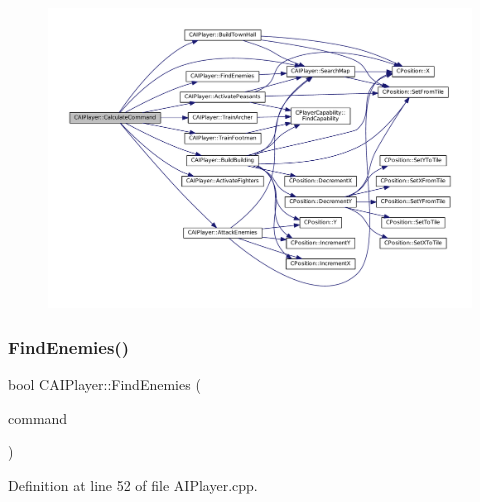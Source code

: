 \begin{figure}[H]
\begin{center}
\leavevmode
\includegraphics[width=350pt]{classCAIPlayer_ae2742efd250c7d6c00b659ccc29c4be3_cgraph}
\end{center}
\end{figure}
\hypertarget{classCAIPlayer_a33b1533570e7a00114d1b85b3551e395}{}\label{classCAIPlayer_a33b1533570e7a00114d1b85b3551e395} 
\subsubsection{\texorpdfstring{Find\+Enemies()}{FindEnemies()}}
{\footnotesize\ttfamily bool C\+A\+I\+Player\+::\+Find\+Enemies (\begin{DoxyParamCaption}\item[{\hyperlink{structSPlayerCommandRequest}{S\+Player\+Command\+Request} \&}]{command }\end{DoxyParamCaption})\hspace{0.3cm}{\ttfamily [protected]}}



Definition at line 52 of file A\+I\+Player.\+cpp.


